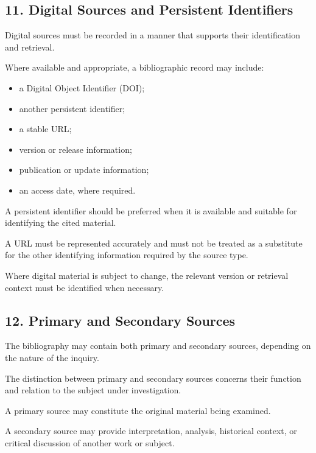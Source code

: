 \subsection*{11. Digital Sources and
Persistent Identifiers}

Digital sources must be
recorded in a manner
that supports their
identification and retrieval.

Where available and
appropriate, a bibliographic
record may include:

\begin{itemize}
    \item a Digital Object
    Identifier (DOI);
    \item another persistent
    identifier;
    \item a stable URL;
    \item version or release
    information;
    \item publication or
    update information;
    \item an access date,
    where required.
\end{itemize}

A persistent identifier
should be preferred when
it is available and suitable
for identifying the cited
material.

A URL must be represented
accurately and must not
be treated as a substitute
for the other identifying
information required
by the source type.

Where digital material
is subject to change,
the relevant version
or retrieval context
must be identified
when necessary.


\subsection*{12. Primary and Secondary Sources}

The bibliography may contain
both primary and secondary
sources, depending on
the nature of the inquiry.

The distinction between
primary and secondary
sources concerns their
function and relation
to the subject under
investigation.

A primary source may
constitute the original
material being examined.

A secondary source may
provide interpretation,
analysis, historical
context, or critical
discussion of another
work or subject.

